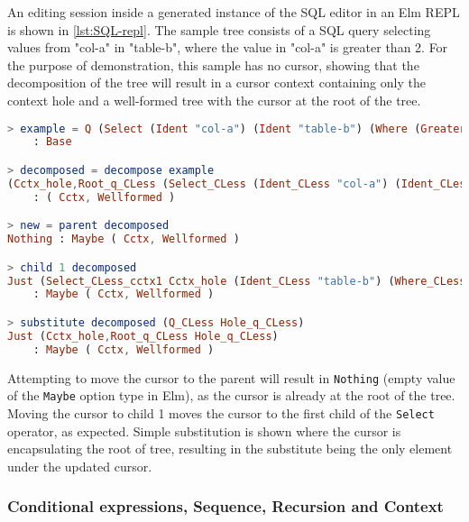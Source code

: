 \documentclass[sigplan,review]{acmart}
\begin{document}
\begin{example}\label{ex:sql-repl}
An editing session inside a generated instance of the SQL editor in an Elm REPL is
shown in \cref{lst:SQL-repl}.
The sample tree consists of a SQL query
selecting values from "col-a" in "table-b", where the value in
"col-a" is greater than 2. For the purpose of demonstration, this sample
has no cursor, showing that the decomposition of the tree will result in a
cursor context containing only the context hole and a well-formed tree
with the cursor at the root of the tree.

\begin{lstlisting}[style=inline, language=elm, caption={SQL editor session in an Elm REPL}, label={lst:SQL-repl}]
> example = Q (Select (Ident "col-a") (Ident "table-b") (Where (Greater (Eident (Ident "col-a")) (Econst (Num 2)))))
    : Base

> decomposed = decompose example
(Cctx_hole,Root_q_CLess (Select_CLess (Ident_CLess "col-a") (Ident_CLess "table-b") (Where_CLess (Greater_CLess (Eident_CLess (Ident_CLess "col-a")) (Econst_CLess (Num_CLess 2))))))
    : ( Cctx, Wellformed )

> new = parent decomposed
Nothing : Maybe ( Cctx, Wellformed )

> child 1 decomposed
Just (Select_CLess_cctx1 Cctx_hole (Ident_CLess "table-b") (Where_CLess (Greater_CLess (Eident_CLess (Ident_CLess "col-a")) (Econst_CLess (Num_CLess 2)))),Root_id_CLess (Ident_CLess "col-a"))
    : Maybe ( Cctx, Wellformed )

> substitute decomposed (Q_CLess Hole_q_CLess)
Just (Cctx_hole,Root_q_CLess Hole_q_CLess)
    : Maybe ( Cctx, Wellformed )
\end{lstlisting}

Attempting to move the cursor to the
parent will result in \texttt{Nothing} (empty value of the \texttt{Maybe} option type in Elm),
as the cursor is already at the root
of the tree. Moving the cursor to child 1 moves the cursor to the first child
of the \texttt{Select} operator, as expected. Simple substitution
is shown where the cursor is encapsulating the root of tree, resulting
in the substitute being the only element under the updated cursor.

\end{example}

\subsubsection{Conditional expressions, Sequence, Recursion and Context}
\end{document}
